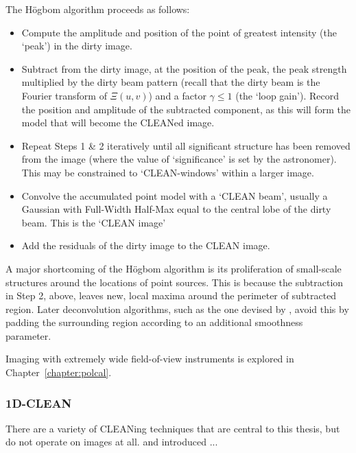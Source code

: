 The H{\"o}gbom algorithm proceeds as follows:
\begin{itemize}
\item Compute the amplitude and position of the point of greatest intensity (the `peak') in the dirty image.
\item Subtract from the dirty image, at the position of the peak, the peak strength multiplied by the dirty beam pattern (recall that the dirty beam is the Fourier transform of $\Xi(u,v)$) and a factor $\gamma \leqslant 1$ (the `loop gain'). Record the position and amplitude of the subtracted component, as this will form the model that will become the CLEANed image.
\item Repeat Steps 1 \& 2 iteratively until all significant structure has been removed from the image (where the value of `significance' is set by the astronomer). This may be constrained to `CLEAN-windows' within a larger image.
\item Convolve the accumulated point model with a `CLEAN beam', usually a Gaussian with Full-Width Half-Max equal to the central lobe of the dirty beam. This is the `CLEAN image'
\item Add the residuals of the dirty image to the CLEAN image.
\end{itemize}

A major shortcoming of the H{\"o}gbom algorithm is its proliferation of small-scale structures around the locations of point sources. This is because the subtraction in Step 2, above, leaves new, local maxima around the perimeter of subtracted region. Later deconvolution algorithms, such as the one devised by \cite{Cornwell.83}, avoid this by padding the surrounding region according to an additional smoothness parameter. 

Imaging with extremely wide field-of-view instruments is explored in Chapter~\ref{chapter:polcal}.

\subsubsection{1D-CLEAN}

There are a variety of CLEANing techniques that are central to this thesis, but do not operate on images at all.
\cite{ParsonsBacker.09} and \cite{Parsons.12b} introduced ...



